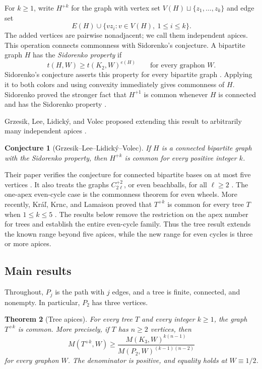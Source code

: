 \documentclass[11pt,a4paper]{article}
\newtheorem{theorem}{Theorem}[section]
\newtheorem{conjecture}[theorem]{Conjecture}
\theoremstyle{remark}
\numberwithin{equation}{section}
\begin{document}
For $k\geq1$, write $H^{+k}$ for the graph with vertex set
$V(H)\sqcup\{z_1,\ldots,z_k\}$ and edge set
\[
 E(H)\cup\{vz_i:v\in V(H),\ 1\leq i\leq k\}.
\]
The added vertices are pairwise nonadjacent; we call them independent
apices. This operation connects commonness with Sidorenko's
conjecture. A bipartite graph $H$ has the \emph{Sidorenko property}
if
\[
 t(H,W)\geq t(K_2,W)^{e(H)}\qquad\text{for every graphon }W.
\]
Sidorenko's conjecture asserts this property for every bipartite
graph \cite{SidorenkoCorrelation}. Applying it to both colors and
using convexity immediately gives commonness of $H$. Sidorenko
proved the stronger fact that $H^{+1}$ is common whenever $H$ is
connected and has the Sidorenko property \cite{SidorenkoFriendly}.

Grzesik, Lee, Lidick\'y, and Volec proposed extending this result to
arbitrarily many independent apices \cite[Conjecture~1.3]{GLLV}.

\begin{conjecture}[Grzesik--Lee--Lidick\'y--Volec]\label{conj:apices}
If $H$ is a connected bipartite graph with the Sidorenko property,
then $H^{+k}$ is common for every positive integer $k$.
\end{conjecture}

Their paper verifies the conjecture for connected bipartite bases
on at most five vertices \cite[Theorem~1.4]{GLLV}. It also treats
the graphs $C_{2\ell}^{+2}$, or even beachballs, for all $\ell\geq2$
\cite[Theorem~4.3]{GLLV}. The one-apex even-cycle case is the
commonness theorem for even wheels. More recently, Kr\'a\v l, Krnc,
and Lamaison proved that $T^{+k}$ is common for every tree $T$ when
$1\leq k\leq5$ \cite[Theorem~1]{KKL}.
The results below remove the restriction on the apex number for
trees and establish the entire even-cycle family. Thus the tree
result extends the known range beyond five apices, while the new
range for even cycles is three or more apices.

\subsection{Main results}

Throughout, $P_j$ is the path with $j$ edges, and a tree is finite,
connected, and nonempty. In particular, $P_2$ has three vertices.

\begin{theorem}[Tree apices]\label{thm:trees}
For every tree $T$ and every integer $k\geq1$, the graph $T^{+k}$
is common. More precisely, if $T$ has $n\geq2$ vertices, then
\begin{equation}\label{eq:tree-two-color}
 M(T^{+k},W)\geq
 \frac{M(K_3,W)^{k(n-1)}}{M(P_2,W)^{(k-1)(n-2)}}
\end{equation}
for every graphon $W$. The denominator is positive, and equality
holds at $W\equiv1/2$.
\end{theorem}
\end{document}
